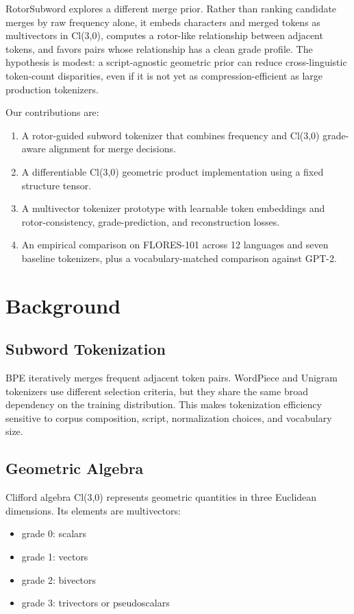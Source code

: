 \documentclass[11pt]{article}
\begin{document}
RotorSubword explores a different merge prior. Rather than ranking candidate merges by raw frequency alone, it embeds characters and merged tokens as multivectors in Cl(3,0), computes a rotor-like relationship between adjacent tokens, and favors pairs whose relationship has a clean grade profile. The hypothesis is modest: a script-agnostic geometric prior can reduce cross-linguistic token-count disparities, even if it is not yet as compression-efficient as large production tokenizers.

Our contributions are:
\begin{enumerate}
  \item A rotor-guided subword tokenizer that combines frequency and Cl(3,0) grade-aware alignment for merge decisions.
  \item A differentiable Cl(3,0) geometric product implementation using a fixed structure tensor.
  \item A multivector tokenizer prototype with learnable token embeddings and rotor-consistency, grade-prediction, and reconstruction losses.
  \item An empirical comparison on FLORES-101 across 12 languages and seven baseline tokenizers, plus a vocabulary-matched comparison against GPT-2.
\end{enumerate}

\section{Background}

\subsection{Subword Tokenization}

BPE iteratively merges frequent adjacent token pairs. WordPiece and Unigram tokenizers use different selection criteria, but they share the same broad dependency on the training distribution. This makes tokenization efficiency sensitive to corpus composition, script, normalization choices, and vocabulary size.

\subsection{Geometric Algebra}

Clifford algebra Cl(3,0) represents geometric quantities in three Euclidean dimensions. Its elements are multivectors:
\begin{itemize}
  \item grade 0: scalars
  \item grade 1: vectors
  \item grade 2: bivectors
  \item grade 3: trivectors or pseudoscalars
\end{itemize}
\end{document}
